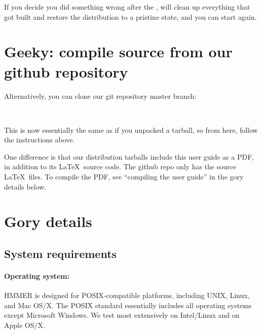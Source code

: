 If you decide you did something wrong after the ,
 will clean up everything that got built and
restore the distribution to a pristine state, and you can start again.


\section{Geeky: compile source from our github repository}

Alternatively, you can clone our git repository master
branch:
  
  \vspace{1ex}
   \\
  \vspace{1ex}

This is now essentially the same as if you unpacked a tarball, so from
here, follow the  instructions above.

One difference is that our distribution tarballs include this user
guide as a PDF, in addition to its \LaTeX\ source code. The github
repo only has the source \LaTeX\ files. To compile the PDF, see
``compiling the user guide'' in the gory details below.


\section{Gory details}

\subsection{System requirements}

\paragraph{Operating system:} HMMER is designed for
POSIX-compatible platforms, including UNIX, Linux, and Mac OS/X. The
POSIX standard essentially includes all operating systems except
Microsoft Windows.  We test most extensively on Intel/Linux
and on Apple OS/X.

